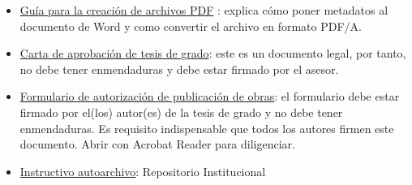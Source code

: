 \begin{itemize}
    \item \href{http://www.eafit.edu.co/biblioteca/servicios/Documents/creacion_archivos_pdf.pdf}{Guía para la creación de archivos PDF} : explica cómo poner metadatos al documento de Word y como convertir el archivo en formato PDF/A.
    \item \href{http://www.eafit.edu.co/biblioteca/busqueda-servicios/Documents/carta_aprobacion_trabajo_grado_eafit.docx}{Carta de aprobación de tesis de grado}: este es un documento legal, por tanto, no debe tener enmendaduras y debe estar firmado por el asesor.
    \item \href{http://www.eafit.edu.co/biblioteca/busqueda-servicios/Documents/formulario_autorizacion_publicacion_obras.pdf}{ Formulario de autorización de publicación de obras}: el formulario debe estar firmado por el(los) autor(es) de la tesis de grado y no debe tener enmendaduras. Es requisito indispensable que todos los autores firmen este documento. Abrir con Acrobat Reader para diligenciar.
    \item \href{http://hdl.handle.net/10784/12512}{ Instructivo autoarchivo}: Repositorio Institucional

\end{itemize}   